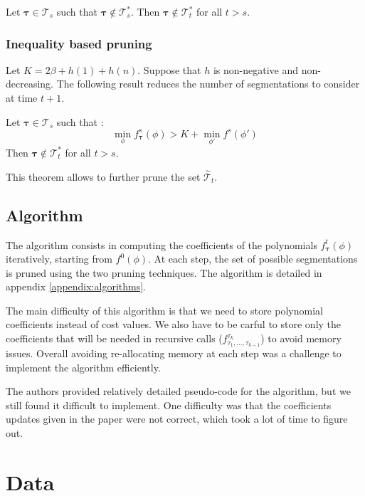 \documentclass[11pt]{article}
\begin{document}
\begin{theorem}
    \label{th:functional_pruning}
    Let $\boldsymbol{\tau}\in\mathcal{T}_s$ such that $\boldsymbol{\tau}\notin \mathcal{T}_s^*$. Then $\boldsymbol{\tau}\notin \mathcal{T}_t^*$ for all $t>s$.
\end{theorem}

\subsubsection{Inequality based pruning} Let $K=2\beta+h(1)+h(n)$. Suppose that $h$ is non-negative and non-decreasing. The following result reduces the number of segmentations to consider at time $t+1$.

\begin{theorem}
    Let $\boldsymbol{\tau}\in\mathcal{T}_s$ such that :
    $$\min_\phi f_{\boldsymbol{\tau}}^s(\phi) > K + \min_{\phi'} f^s(\phi')$$
    Then $\boldsymbol{\tau}\notin \mathcal{T}_t^*$ for all $t>s$.
\end{theorem}

This theorem allows to further prune the set $\hat{\mathcal{T}}_t$.

\subsection{Algorithm}

The algorithm consists in computing the coefficients of the polynomials $f^t_{\boldsymbol{\tau}}(\phi)$ iteratively, starting from $f^0(\phi)$. At each step, the set of possible segmentations is pruned using the two pruning techniques. The algorithm is detailed in appendix \ref{appendix:algorithms}.

The main difficulty of this algorithm is that we need to store polynomial coefficients instead of cost values. We also have to be carful to store only the coefficients that will be needed in recursive calls ($f^{\tau_k}_{\tau_1,\dots,\tau_{k-1}}$) to avoid memory issues. Overall avoiding re-allocating memory at each step was a challenge to implement the algorithm efficiently.

The authors provided relatively detailed pseudo-code for the algorithm, but we still found it difficult to implement. One difficulty was that the coefficients updates given in the paper were not correct, which took a lot of time to figure out.

\section{Data}
\end{document}
